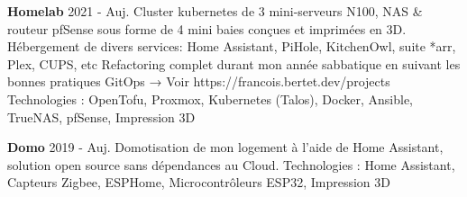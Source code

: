 

\begin{cventries}

  \cvproject
    {\textbf{Homelab}} %
    {2021 - Auj.} %
    {
      Cluster kubernetes de 3 mini-serveurs N100, NAS \& routeur pfSense sous forme de 4 mini baies conçues et imprimées en 3D. \newline
      Hébergement de divers services: Home Assistant, PiHole, KitchenOwl, suite *arr, Plex, CUPS, etc \newline
      Refactoring complet durant mon année sabbatique en suivant les bonnes pratiques GitOps → Voir https://francois.bertet.dev/projects
    }
    {Technologies : OpenTofu, Proxmox, Kubernetes (Talos), Docker, Ansible, TrueNAS, pfSense, Impression 3D}

  \cvproject
    {\textbf{Domo}} %
    {2019 - Auj.} %
    {
      Domotisation de mon logement à l'aide de Home Assistant, solution open source sans dépendances au Cloud.
    }
    {Technologies : Home Assistant, Capteurs Zigbee, ESPHome, Microcontrôleurs ESP32, Impression 3D}

\end{cventries}
